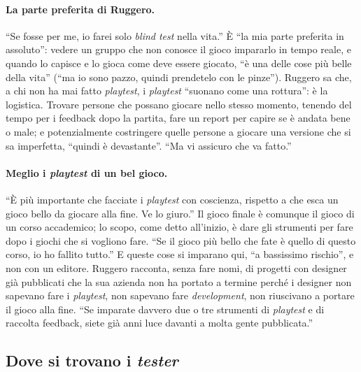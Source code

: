\paragraph{La parte preferita di Ruggero.} ``Se fosse per me, io farei solo \emph{blind
test} nella vita.'' È ``la mia parte preferita in assoluto'': vedere un gruppo che non
conosce il gioco impararlo in tempo reale, e quando lo capisce e lo gioca come deve essere
giocato, ``è una delle cose più belle della vita'' (``ma io sono pazzo, quindi prendetelo
con le pinze''). Ruggero sa che, a chi non ha mai fatto \emph{playtest}, i \emph{playtest}
``suonano come una rottura'': è la logistica. Trovare persone che possano giocare nello
stesso momento, tenendo del tempo per i feedback dopo la partita, fare un report per capire
se è andata bene o male; e potenzialmente costringere quelle persone a giocare una
versione che si sa imperfetta, ``quindi è devastante''. ``Ma vi assicuro che va fatto.''

\paragraph{Meglio i \emph{playtest} di un bel gioco.} ``È più importante che facciate i
\emph{playtest} con coscienza, rispetto a che esca un gioco bello da giocare alla fine.
Ve lo giuro.'' Il gioco finale è comunque il gioco di un corso accademico; lo scopo, come
detto all'inizio, è dare gli strumenti per fare dopo i giochi che si vogliono fare. ``Se
il gioco più bello che fate è quello di questo corso, io ho fallito tutto.'' E queste cose
si imparano qui, ``a bassissimo rischio'', e non con un editore. Ruggero racconta, senza
fare nomi, di progetti con designer già pubblicati che la sua azienda non ha portato a
termine perché i designer non sapevano fare i \emph{playtest},
non sapevano fare \emph{development}, non riuscivano a portare il gioco alla fine. ``Se
imparate davvero due o tre strumenti di \emph{playtest} e di raccolta feedback, siete già
anni luce davanti a molta gente pubblicata.''

\subsection{Dove si trovano i \emph{tester}}

